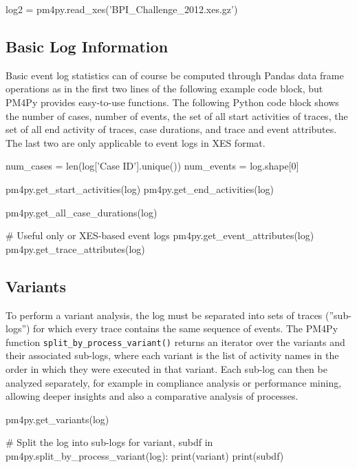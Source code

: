 \begin{pythoncode}
log2 = pm4py.read_xes('BPI_Challenge_2012.xes.gz')
\end{pythoncode}

\subsection*{Basic Log Information}

Basic event log statistics can of course be computed through Pandas data frame operations as in the first two lines of the following example code block, but PM4Py provides easy-to-use functions. The following Python code block shows the number of cases, number of events, the set of all start activities of traces, the set of all end activity of traces, case durations, and trace and event attributes. The last two are only applicable to event logs in XES format.

\begin{samepage}
\begin{pythoncode}
num_cases = len(log['Case ID'].unique())
num_events = log.shape[0]

pm4py.get_start_activities(log)
pm4py.get_end_activities(log)

pm4py.get_all_case_durations(log)

# Useful only or XES-based event logs
pm4py.get_event_attributes(log)
pm4py.get_trace_attributes(log)
\end{pythoncode}
\end{samepage}

\subsection*{Variants}

To perform a variant analysis, the log must be separated into sets of traces (''sub-logs'') for which every trace contains the same sequence of events. The PM4Py function \texttt{split\_by\_process\_variant()} returns an iterator over the variants and their associated sub-logs, where each variant is the list of activity names in the order in which they were executed in that variant. Each sub-log can then be analyzed separately, for example in compliance analysis or performance mining, allowing deeper insights and also a comparative analysis of processes.

\begin{samepage}
\begin{pythoncode}
pm4py.get_variants(log)

# Split the log into sub-logs
for variant, subdf in pm4py.split_by_process_variant(log):
    print(variant)
    print(subdf)  
\end{pythoncode}
\end{samepage}

